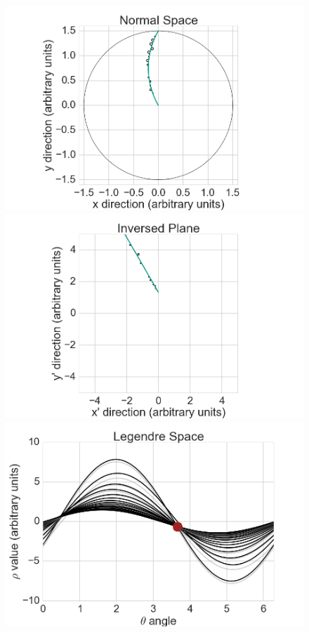 \begin{figure}
 \centering
 \includegraphics[scale=0.15]{figures/theory/legendre_1.png}
 \includegraphics[scale=0.15]{figures/theory/legendre_2.png}
 \includegraphics[scale=0.15]{figures/theory/legendre_3.png}

\end{figure}
